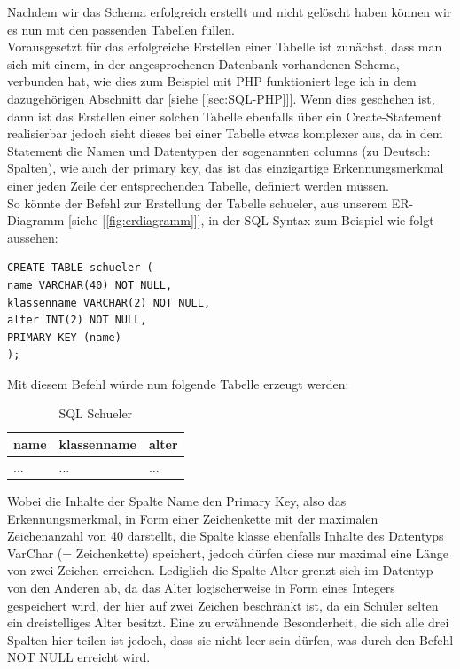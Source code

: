 \documentclass[12pt,a4paper,bibliography=totocnumbered,listof=totocnumbered]{scrartcl}
\begin{document}
Nachdem wir das Schema erfolgreich erstellt und nicht gelöscht haben können wir es nun mit den passenden Tabellen füllen.\\
Vorausgesetzt für das erfolgreiche Erstellen einer Tabelle ist zunächst, dass man sich mit einem, in der angesprochenen Datenbank vorhandenen Schema, verbunden hat, wie dies zum Beispiel mit PHP funktioniert lege ich in dem dazugehörigen Abschnitt dar [siehe [\ref{sec:SQL-PHP}]]. 
Wenn dies geschehen ist, dann ist das Erstellen einer solchen Tabelle ebenfalls über ein \glqq Create-Statement\grqq{} realisierbar jedoch sieht dieses bei einer Tabelle etwas komplexer aus, da in dem Statement die Namen und Datentypen der sogenannten \glqq columns\grqq{} (zu Deutsch: Spalten), wie auch der \glqq primary key\grqq{}, das ist das einzigartige Erkennungsmerkmal einer jeden Zeile der entsprechenden Tabelle, definiert werden müssen.\\
 

So könnte der Befehl zur Erstellung der Tabelle \glqq schueler\grqq{}, aus unserem ER-Diagramm [siehe [\ref{fig:erdiagramm}]], in der SQL-Syntax zum Beispiel wie folgt aussehen:
\pagebreak

\begin{lstlisting}[caption= SQL Create Table, label=lst:sql-create-table]
CREATE TABLE schueler (
name VARCHAR(40) NOT NULL, 
klassenname VARCHAR(2) NOT NULL, 
alter INT(2) NOT NULL,
PRIMARY KEY (name)
);
\end{lstlisting}

Mit diesem Befehl würde nun folgende Tabelle erzeugt werden:

\vspace{1em}
\begin{table}[!h]
	\centering
	\begin{tabular}{|l|l|l|}
		\hline
		\textbf{name} & \textbf{klassenname} & \textbf{alter}\\
		\hline
		... & ... & ...\\
		
	\end{tabular}
	\caption{SQL Schueler}
	\label{tab:sql-schueler}
\end{table}

Wobei die Inhalte der Spalte \glqq Name\grqq{} den Primary Key, also das Erkennungsmerkmal, in Form einer Zeichenkette mit der maximalen Zeichenanzahl von 40 darstellt, die Spalte \glqq klasse\grqq{} ebenfalls Inhalte des Datentyps VarChar (= Zeichenkette) speichert, jedoch dürfen diese nur maximal eine Länge von zwei Zeichen erreichen.
Lediglich die Spalte \glqq Alter\grqq{} grenzt sich im Datentyp von den Anderen ab, da das Alter logischerweise in Form eines Integers gespeichert wird, der hier auf zwei Zeichen beschränkt ist, da ein Schüler selten ein dreistelliges Alter besitzt. Eine zu erwähnende Besonderheit, die sich alle drei Spalten hier teilen ist jedoch, dass sie nicht leer sein dürfen, was durch den Befehl \glqq NOT NULL\grqq{} erreicht wird.
\end{document}
